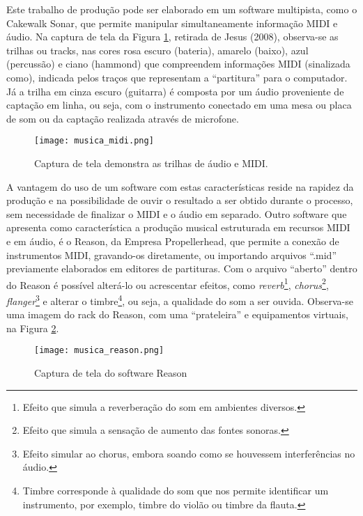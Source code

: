 Este trabalho de produção pode ser elaborado em um software multipista, como o Cakewalk Sonar, que permite manipular simultaneamente informação MIDI e áudio. Na captura de tela da Figura \ref{img:midi}, retirada de Jesus (2008), observa-se as trilhas ou tracks, nas cores rosa escuro (bateria), amarelo (baixo), azul (percussão) e ciano (hammond) que compreendem informações MIDI (sinalizada como), indicada pelos traços que representam a ``partitura'' para o computador. Já a trilha em cinza escuro (guitarra) é composta por um áudio proveniente de captação em linha, ou seja, com o instrumento conectado em uma mesa ou placa de som ou da captação realizada através de microfone. 

\begin{figure}[!ht]
 \centering
 \texttt{[image: musica\_midi.png]}
 \caption{Captura de tela demonstra as trilhas de áudio e MIDI. \cite{bib:musica_jesus}}
 \label{img:midi}
\end{figure}

A vantagem do uso de um software com estas características reside na rapidez da produção e na possibilidade de ouvir o resultado a ser obtido durante o processo, sem necessidade de finalizar o MIDI e o áudio em separado. Outro software que apresenta como característica a produção musical
 estruturada em recursos MIDI e em áudio, é o Reason, da Empresa Propellerhead, que permite a conexão de instrumentos MIDI, gravando-os diretamente, ou importando arquivos ``.mid'' previamente elaborados em 
editores de partituras. Com o arquivo ``aberto'' dentro do Reason é possível alterá-lo ou acrescentar efeitos, como \textit{reverb}\footnote{Efeito que simula a reverberação do som em ambientes diversos.}, \textit{chorus}\footnote{Efeito que simula a sensação de aumento das fontes sonoras.}, \textit{flanger}\footnote{Efeito simular ao chorus, embora soando como se houvessem interferências no áudio.} 
e alterar o timbre\footnote{Timbre corresponde à qualidade do som que nos permite identificar um instrumento, por exemplo, timbre do violão ou timbre da flauta.}, ou seja, a qualidade do som a ser ouvida. Observa-se uma imagem do rack do Reason, com  uma ``prateleira'' e equipamentos virtuais, na 
Figura \ref{img:reason}.

\begin{figure}[!ht]
 \centering
 \texttt{[image: musica\_reason.png]}
 \caption{Captura de tela do software Reason}
 \label{img:reason}
\end{figure}

